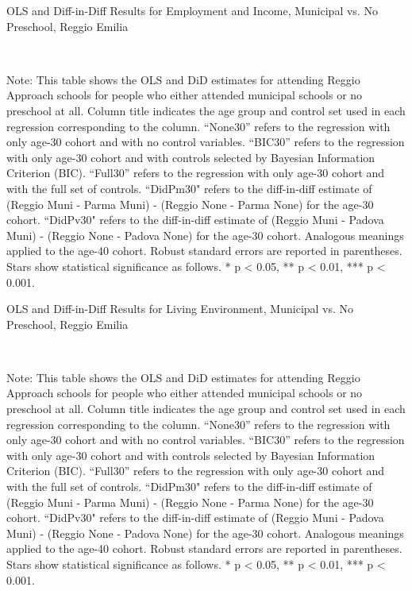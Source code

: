 \begin{landscape}
\begin{table}[H] \caption{OLS and Diff-in-Diff Results for Employment and Income, Municipal vs. No Preschool, Reggio Emilia} \label{ols-W-reg}
\scalebox{0.85}{
}
\vspace{1ex} \\
\footnotesize\raggedright{Note: This table shows the OLS and DiD estimates for attending Reggio Approach schools for people who either attended municipal schools or no preschool at all. Column title indicates the age group and control set used in each regression corresponding to the column. ``None30'' refers to the regression with only age-30 cohort and with no control variables. ``BIC30'' refers to the regression with only age-30 cohort and with controls selected by Bayesian Information Criterion (BIC). ``Full30'' refers to the regression with only age-30 cohort and with the full set of controls. ``DidPm30" refers to the diff-in-diff estimate of (Reggio Muni - Parma Muni) - (Reggio None - Parma None) for the age-30 cohort. ``DidPv30" refers to the diff-in-diff estimate of (Reggio Muni - Padova Muni) - (Reggio None - Padova None) for the age-30 cohort. Analogous meanings applied to the age-40 cohort. Robust standard errors are reported in parentheses. Stars show statistical significance as follows. * p < 0.05, ** p < 0.01, *** p < 0.001.}
\end{table}


\begin{table}[H] \caption{OLS and Diff-in-Diff Results for Living Environment, Municipal vs. No Preschool, Reggio Emilia} \label{ols-L-reg}
\scalebox{0.85}{
}
\vspace{1ex} \\
\footnotesize\raggedright{Note: This table shows the OLS and DiD estimates for attending Reggio Approach schools for people who either attended municipal schools or no preschool at all. Column title indicates the age group and control set used in each regression corresponding to the column. ``None30'' refers to the regression with only age-30 cohort and with no control variables. ``BIC30'' refers to the regression with only age-30 cohort and with controls selected by Bayesian Information Criterion (BIC). ``Full30'' refers to the regression with only age-30 cohort and with the full set of controls. ``DidPm30" refers to the diff-in-diff estimate of (Reggio Muni - Parma Muni) - (Reggio None - Parma None) for the age-30 cohort. ``DidPv30" refers to the diff-in-diff estimate of (Reggio Muni - Padova Muni) - (Reggio None - Padova None) for the age-30 cohort. Analogous meanings applied to the age-40 cohort. Robust standard errors are reported in parentheses. Stars show statistical significance as follows. * p < 0.05, ** p < 0.01, *** p < 0.001.}
\end{table}


\end{landscape}

